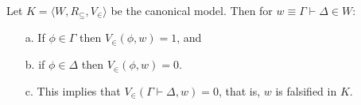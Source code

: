 \documentclass{article}
\begin{document}
\begin{thm}[Falsification in $K$]
  \label{thm:falsification_in_k}
  Let $K = \langle W, R_\subseteq, V_\in \rangle$ be the canonical model. Then for $w \equiv \Gamma \vdash \Delta \in W$:
  \begin{center}
    \begin{itemize}
    \item[a.] If $\phi \in \Gamma$ then $V_\in(\phi, w) = 1$, and
    \item[b.] if $\phi \in \Delta$ then $V_\in(\phi,w) = 0$.
    \item[c.] This implies that $V_\in(\Gamma \vdash \Delta, w) = 0$, that is, $w$ is 
      falsified in $K$.
    \end{itemize}
  \end{center}  
\end{thm}
\end{document}
